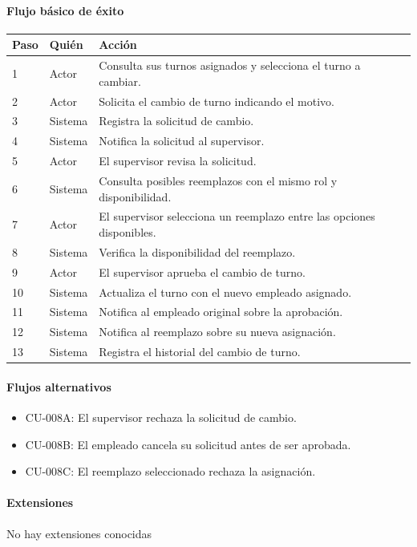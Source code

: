 \paragraph{Flujo básico de éxito}
\begin{longtable}{P{1.1cm}P{1.8cm}P{10.5cm}}
\toprule
\textbf{Paso} & \textbf{Quién} & \textbf{Acción}\\
\midrule
{} & Actor & Consulta sus turnos asignados y selecciona el turno a cambiar.\\
2 & Actor & Solicita el cambio de turno indicando el motivo.\\
3 & Sistema & Registra la solicitud de cambio.\\
4 & Sistema & Notifica la solicitud al supervisor.\\
5 & Actor & El supervisor revisa la solicitud.\\
6 & Sistema & Consulta posibles reemplazos con el mismo rol y disponibilidad.\\
7 & Actor & El supervisor selecciona un reemplazo entre las opciones disponibles.\\
8 & Sistema & Verifica la disponibilidad del reemplazo.\\
9 & Actor & El supervisor aprueba el cambio de turno.\\
10 & Sistema & Actualiza el turno con el nuevo empleado asignado.\\
11 & Sistema & Notifica al empleado original sobre la aprobación.\\
12 & Sistema & Notifica al reemplazo sobre su nueva asignación.\\
13 & Sistema & Registra el historial del cambio de turno.\\
\bottomrule
\end{longtable}

\paragraph{Flujos alternativos}
\begin{itemize}[leftmargin=1.4em, topsep=1pt]
  \item CU-008A: El supervisor rechaza la solicitud de cambio.
  \item CU-008B: El empleado cancela su solicitud antes de ser aprobada.
  \item CU-008C: El reemplazo seleccionado rechaza la asignación.
\end{itemize}

\paragraph{Extensiones}
No hay extensiones conocidas


